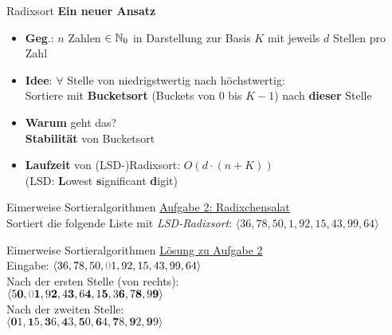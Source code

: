 \begin{frame}{Radixsort}
	\textbf{Ein neuer Ansatz} \\
	\begin{itemize}
		\item \textbf{Geg}.: $n$ Zahlen $\in \mathbb{N}_0$  in Darstellung zur Basis $K$ mit jeweils $d$ Stellen pro Zahl 
		\pause
		\item \textbf{Idee}: $\forall $ Stelle von niedrigstwertig nach höchstwertig: \\ Sortiere mit \textbf{Bucketsort} (Buckets von $0$ bis $K-1$) nach \textbf{dieser} Stelle
		\pause
		\item \textbf{Warum} geht das? \\
		\pause 
		\impl \textbf{Stabilität} von Bucketsort
		\item \textbf{Laufzeit} von (LSD-)Radixsort: $O(d \cdot (n + K))$ \\
		{\small (LSD: \textbf{L}owest \textbf{s}ignificant \textbf{d}igit)}
	\end{itemize}
\end{frame}

\begin{frame}{Eimerweise Sortieralgorithmen}
	\underline{Aufgabe 2: Radixchensalat} \\
	Sortiert die folgende Liste mit \emph{LSD-Radixsort}:  $\langle 36, 78, 50, 1, 92, 15, 43, 99, 64 \rangle$
\end{frame}

\begin{frame}{Eimerweise Sortieralgorithmen}
	\underline{Lösung zu Aufgabe 2} \\[0,25cm]
	Eingabe:  $\langle 36, 78, 50, \gray{0}1, 92, 15, 43, 99, 64 \rangle$
	\\[0,25cm]
	Nach der ersten Stelle (von rechts): \\ $\langle 5\textbf{0}, \gray{0}\textbf{1}, 9\textbf{2}, 4\textbf{3}, 6\textbf{4}, 1\textbf{5}, 3\textbf{6}, 7\textbf{8}, 9\textbf{9} \rangle$
	\\[0,25cm]
	Nach der zweiten Stelle: \\ $\langle \textbf{0}1, \textbf{1}5, \textbf{3}6, \textbf{4}3, \textbf{5}0, \textbf{6}4, \textbf{7}8, \textbf{9}2, \textbf{9}9 \rangle$
\end{frame}

